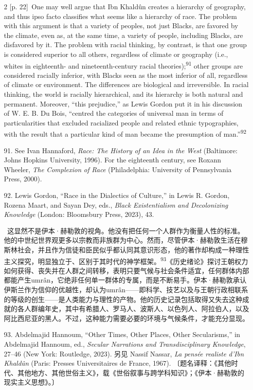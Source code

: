 \documentclass[10pt,a4paper]{article}
\begin{document}
\begin{paracol}{2}
\switchcolumn
{\scriptsize\color{gray} [p. 22]}\ One may well argue that Ibn Khaldûn creates a hierarchy of geography, and thus ipso facto classifies what seems like a hierarchy of race. The problem with this argument is that a variety of peoples, not just Blacks, are favored by the climate, even as, at the same time, a variety of people, including Blacks, are disfavored by it. The problem with racial thinking, by contrast, is that one group is considered superior to all others, regardless of climate or geography (i.e., whites in eighteenth- and nineteenth-century racial theories);\nobreak\textsuperscript{91} other groups are considered racially inferior, with Blacks seen as the most inferior of all, regardless of climate or environment. The differences are biological and irreversible. In racial thinking, the world is racially hierarchical, and its hierarchy is both natural and permanent. Moreover, “this prejudice,” as Lewis Gordon put it in his discussion of W. E. B. Du Bois, “centred the categories of universal man in terms of particularities that excluded racialized people and related ethnic typographies, with the result that a particular kind of man became the presumption of man.”\nobreak\textsuperscript{92}\par{\small 91. See Ivan Hannaford, \textit{Race: The History of an Idea in the West} (Baltimore: Johns Hopkins University, 1996). For the eighteenth century, see Roxann Wheeler, \textit{The Complexion of Race} (Philadelphia: University of Pennsylvania Press, 2000).\par}{\small 92. Lewis Gordon, “Race in the Dialectics of Culture,” in Lewis R. Gordon, Rozena Maart, and Sayan Dey, eds., \textit{Black Existentialism and Decolonizing Knowledge} (London: Bloomsbury Press, 2023), 43.\par}
\switchcolumn*
{\scriptsize\color{gray} [p. 22]}\ 这显然不是伊本·赫勒敦的视角。他没有把任何一个人群作为衡量人性的标准。他的中世纪世界观更多以宗教而非族群为中心。然而，尽管伊本·赫勒敦生活在穆斯林社会，并且作为信徒和臣民似乎都认同其意识形态，他的著作却构成一种理性主义探究，明显独立于、区别于其时代的神学框\mbox{架。\textsuperscript{93}}《历史绪论》探讨王朝权力如何获得、丧失并在人群之间转移，表明只要气候与社会条件适宜，任何群体内部都能产生umrân，它绝非任何单一群体的专属，而是不断易手。伊本·赫勒敦承认伊斯兰作为信仰的优越性，却认为umrân——即科学、技艺以及与王朝行政相联系的等级的创生——是人类能力与理性的产物。他的历史记录包括取得又失去这种成就的各人群编年史，其中有希腊人、罗马人、波斯人、以色列人、阿拉伯人，以及阿比西尼亚的黑人。不过，这种能力需要必要的环境与气候条件，才能充分显现。\par{\small 93. Abdelmajid Hannoum, “Other Times, Other Places, Other Secularisms,” in Abdelmajid Hannoum, ed., \textit{Secular Narrations and Transdisciplinary Knowledge}, 27–46 (New York: Routledge, 2023). 另见 Nassif Nassar, \textit{La pensée realiste d’Ibn Khaldûn} (Paris: Presses Universitaires de France, 1967). 〔题名译释：《其他时代、其他地方、其他世俗主义》，载《世俗叙事与跨学科知识》；《伊本·赫勒敦的现实主义思想》。〕\par}

\end{paracol}
\end{document}
